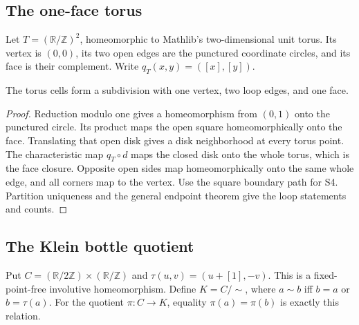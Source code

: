 \subsection{The one-face torus}

\begin{definition}\label{def:torus-cells}

  Let $T=(\mathbb R/\mathbb Z)^2$, homeomorphic to Mathlib's
  two-dimensional unit torus. Its vertex is $(0,0)$, its two open edges
  are the punctured coordinate circles, and its face is their complement.
  Write $q_T(x,y)=([x],[y])$.
\end{definition}

\begin{proposition}\label{prop:torus-subdivision}

  The torus cells form a subdivision with one vertex, two loop edges, and one face.
\end{proposition}
\begin{proof}

  Reduction modulo one gives a homeomorphism from $(0,1)$ onto the punctured
  circle. Its product maps the open square homeomorphically onto the face.
  Translating that open disk gives a disk neighborhood at every torus point.
  The characteristic map $q_T\circ d$ maps the closed disk onto the whole
  torus, which is the face closure. Opposite open sides map homeomorphically
  onto the same whole edge, and all corners map to the vertex. Use the
  square boundary path for S4. Partition uniqueness and the general endpoint
  theorem give the loop statements and counts.
\end{proof}

\subsection{The Klein bottle quotient}

\begin{definition}\label{def:klein-quotient}

  Put $C=(\mathbb R/2\mathbb Z)\times(\mathbb R/\mathbb Z)$ and
  $\tau(u,v)=(u+[1],-v)$. This is a fixed-point-free involutive homeomorphism.
  Define $K=C/{\sim}$, where $a\sim b$ iff $b=a$ or $b=\tau(a)$.
  For the quotient $\pi:C\to K$, equality $\pi(a)=\pi(b)$ is exactly this relation.
\end{definition}


